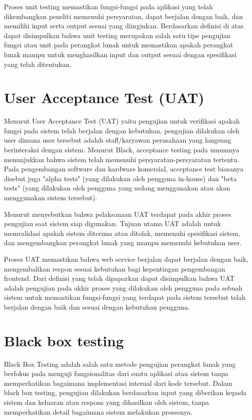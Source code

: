 Proses unit testing memastikan fungsi-fungsi pada aplikasi yang telah dikembangkan peneliti memenuhi persyaratan, dapat berjalan dengan baik, dan memiliki input serta output sesuai yang diinginkan. Berdasarkan definisi di atas dapat disimpulkan bahwa unit testing merupakan salah satu tipe pengujian fungsi atau unit pada perangkat lunak untuk memastikan apakah perangkat lunak mampu untuk menghasilkan input dan output sesuai dengan spesifikasi yang telah ditentukan.


\section{User Acceptance Test (UAT)}
Menurut \citep{perry2006effectivemethods} User Acceptance Test (UAT) yaitu pengujian untuk verifikasi apakah fungsi pada sistem telah berjalan dengan kebutuhan, pengujian dilakukan oleh user dimana user tersebut adalah staff/karyawan perusahaan yang langsung berinteraksi dengan sistem. Menurut Black, acceptance testing pada umumnya menunjukkan bahwa sistem telah memenuhi persyaratan-persyaratan tertentu. Pada pengembangan software dan hardware komersial, acceptance test biasanya disebut juga "alpha tests" (yang dilakukan oleh pengguna in-house) dan "beta tests" (yang dilakukan oleh pengguna yang sedang menggunakan atau akan menggunakan sistem tersebut). 

Menurut \citep{hady2020user} menyebutkan bahwa pelaksanaan UAT terdapat pada akhir proses pengujian saat sistem siap digunakan. Tujuan utama UAT adalah untuk memvalidasi apakah sistem diterima atau ditolak, memenuhi spesifikasi sistem, dan mengembangkan perangkat lunak yang mampu memenuhi kebutuhan user. 

Proses UAT memastikan bahwa web service berjalan dapat berjalan dengan baik, mengembalikan respon sesuai kebutuhan bagi kepentingan pengembangan frontend. Dari definisi yang telah dipaparkan dapat disimpulkan bahwa UAT adalah pengujian pada akhir proses yang dilakukan oleh pengguna pada sebuah sistem untuk memastikan fungsi-fungsi yang terdapat pada sistem tersebut telah berjalan dengan baik dan sesuai dengan kebutuhan pengguna.

\section{Black box testing}
Black Box Testing adalah salah satu metode pengujian perangkat lunak yang berfokus pada menguji fungsionalitas dari suatu aplikasi atau sistem tanpa memperhatikan bagaimana implementasi internal dari kode tersebut. Dalam black box testing, pengujian dilakukan berdasarkan input yang diberikan kepada sistem dan keluaran atau respons yang dihasilkan oleh sistem, tanpa memperhatikan detail bagaimana sistem melakukan prosesnya.

